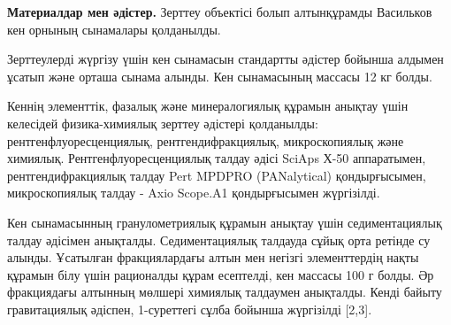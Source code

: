 
{\bfseries Материалдар мен әдістер.} Зерттеу объектісі болып алтынқұрамды
Васильков кен орнының сынамалары қолданылды.

Зерттеулерді жүргізу үшін кен сынамасын стандартты әдістер бойынша
алдымен ұсатып және орташа сынама алынды. Кен сынамасының массасы 12 кг
болды.

Кеннің элементтік, фазалық және минералогиялық құрамын анықтау үшін
келесідей физика-химиялық зерттеу әдістері қолданылды:
рентгенфлуоресценциялық, рентгендифракциялық, микроскопиялық және
химиялық. Рентгенфлуоресценциялық талдау әдісі SciAps Х-50 аппаратымен,
рентгендифракциялық талдау Pert MPDPRO (PANalytical) қондырғысымен,
микроскопиялық талдау - Axio Scope.A1 қондырғысымен жүргізілді.

Кен сынамасынның гранулометриялық құрамын анықтау үшін седиментациялық
талдау әдісімен анықталды. Седиментациялық талдауда сұйық орта ретінде
су алынды. Ұсатылған фракциялардағы алтын мен негізгі элементтердің
нақты құрамын білу үшін рационалды құрам есептелді, кен массасы 100 г
болды. Әр фракциядағы алтынның мөлшері химиялық талдаумен анықталды.
Кенді байыту гравитациялық әдіспен, 1-суреттегі сұлба бойынша жүргізілді
{[}2,3{]}.

